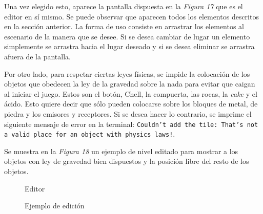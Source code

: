 \documentclass[a4paper]{article}
\begin{document}
Una vez elegido esto, aparece la pantalla dispuesta en la \textit{Figura 17} que es el editor en sí mismo. Se puede observar que aparecen todos los elementos descritos en la sección anterior. La forma de uso consiste en arrastrar los elementos al escenario de la manera que se desee. Si se desea cambiar de lugar un elemento simplemente se arrastra hacia el lugar deseado y si se desea eliminar se arrastra afuera de la pantalla. 

Por otro lado, para respetar ciertas leyes físicas, se impide la colocación de los objetos que obedecen la ley de la gravedad sobre la nada para evitar que caigan al iniciar el juego. Estos son el botón, Chell, la compuerta, las rocas, la \textit{cake} y el ácido. Esto quiere decir que sólo pueden colocarse sobre los bloques de metal, de piedra y los emisores y receptores. Si se desea hacer lo contrario, se imprime el siguiente mensaje de error en la terminal: \texttt{Couldn't add the tile: That's not a valid place for an object with physics laws!}.

Se muestra en la \textit{Figura 18} un ejemplo de nivel editado para mostrar a los objetos con ley de gravedad bien dispuestos y la posición libre del resto de los objetos.

\begin{figure}[!h]
	\caption{Editor}
	\label{fig:diagrama17}
\end{figure}

\begin{figure}[!h]
	\caption{Ejemplo de edición}
	\label{fig:diagrama18}
\end{figure}
\end{document}
